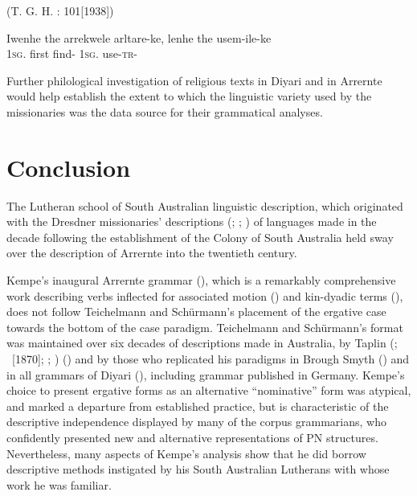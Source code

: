 (T. G. H. \citealt{strehlow_aranda_1944}: 101[1938])


\gll Iwenhe             the     arrekwele    arltare-ke,       lenhe   the     usem-ile-ke\\
               1\textsc{sg}.      first              find-         1\textsc{sg}.   use-\textsc{tr}-\\
\z


Further philological investigation of religious texts in Diyari and in Arrernte would help establish the extent to which the linguistic variety used by the missionaries was the data source for their grammatical analyses.

\section{Conclusion}
\label{sec:key:9.5}

The Lutheran school of South Australian linguistic description, which originated with the Dresdner missionaries' descriptions (\citealt{teichelmann_outlines_1840}; \citealt{meyer_vocabulary_1843}; \citealt{schurmann_letter_1844}) of languages made in the decade following the establishment of the Colony of South Australia held sway over the description of Arrernte into the twentieth century.

Kempe’s inaugural Arrernte grammar (\citeyear{kempe_grammar_1891}), which is a remarkably comprehensive work describing verbs inflected for associated motion () and kin-dyadic terms (), does not follow Teichelmann and Schürmann’s placement of the ergative case towards the bottom of the case paradigm. Teichelmann and Schürmann’s format was maintained over six decades of descriptions made in Australia, by Taplin (\citeyear{taplin_vocabulary_1867}; \citeyear{taplin_notes_1872}~[1870]; \citeyear{taplin_native_1874}; \citeyear{taplin_grammar_1878}) () and by those who replicated his paradigms in Brough Smyth () and in all grammars of Diyari (), including  grammar published in Germany. Kempe’s choice to present ergative forms as an alternative “nominative” form was atypical, and marked a departure from established practice, but is characteristic of the descriptive independence displayed by many of the corpus grammarians, who confidently presented new and alternative representations of PN structures. Nevertheless, many aspects of Kempe’s analysis show that he did borrow descriptive methods instigated by his South Australian Lutherans with whose work he was familiar.

